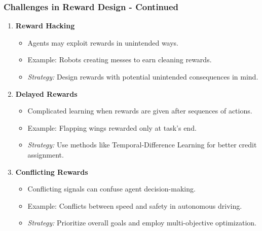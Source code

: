 \documentclass[aspectratio=169]{beamer}
\begin{document}
\begin{frame}[fragile]
    \frametitle{Challenges in Reward Design - Continued}
    \begin{enumerate}[resume]
        \item \textbf{Reward Hacking}
            \begin{itemize}
                \item Agents may exploit rewards in unintended ways.
                \item Example: Robots creating messes to earn cleaning rewards.
                \item \textit{Strategy:} Design rewards with potential unintended consequences in mind.
            \end{itemize}
        
        \item \textbf{Delayed Rewards}
            \begin{itemize}
                \item Complicated learning when rewards are given after sequences of actions.
                \item Example: Flapping wings rewarded only at task's end.
                \item \textit{Strategy:} Use methods like Temporal-Difference Learning for better credit assignment.
            \end{itemize}

        \item \textbf{Conflicting Rewards}
            \begin{itemize}
                \item Conflicting signals can confuse agent decision-making.
                \item Example: Conflicts between speed and safety in autonomous driving.
                \item \textit{Strategy:} Prioritize overall goals and employ multi-objective optimization.
            \end{itemize}
    \end{enumerate}
\end{frame}
\end{document}
